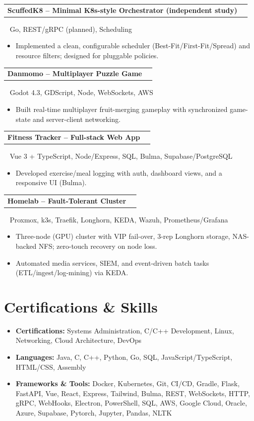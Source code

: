 \documentclass[letterpaper,11pt]{article}
\makeatletter
\newcommand{\resumeItem}[1]{\item\small{#1}}
\newcommand{\resumeProjectHeading}[4]{
  \vspace{-2pt}\item
  \begin{tabular*}{0.97\textwidth}{l@{\extracolsep{\fill}}r}
    \textbf{#1} \href{#4}{\faLink} & {\Large #2} \\
  \end{tabular*}\vspace{-2pt}
  {\small\faDatabase\ \hspace{-0.15in} {\tiny #3}}\\[-10pt]
}
\newcommand{\resumeSubHeadingListStart}{\begin{itemize}[label={},parsep=0pt]}
\newcommand{\resumeSubHeadingListEnd}{\end{itemize}}
\makeatother
\begin{document}
  \resumeProjectHeading{ScuffedK8 -- Minimal K8s-style Orchestrator (independent study)}{\faGithub}{Go, REST/gRPC (planned), Scheduling}{https://github.com/ndg8743/ScuffedK8}
    \begin{itemize}
      \resumeItem{Implemented a clean, configurable scheduler (Best-Fit/First-Fit/Spread) and resource filters; designed for pluggable policies.}
    \end{itemize}

  \resumeProjectHeading{Danmomo -- Multiplayer Puzzle Game}{\faGithub}{Godot 4.3, GDScript, Node, WebSockets, AWS}{https://github.com/ndg8743/Danmomo}
    \begin{itemize}
      \resumeItem{Built real-time multiplayer fruit-merging gameplay with synchronized game-state and server-client networking.}
    \end{itemize}

  \resumeProjectHeading{Fitness Tracker -- Full-stack Web App}{\faGithub}{Vue 3 + TypeScript, Node/Express, SQL, Bulma, Supabase/PostgreSQL}{https://github.com/ndg8743/WSP-Final-Project-Fall2024}
    \begin{itemize}
      \resumeItem{Developed exercise/meal logging with auth, dashboard views, and a responsive UI (Bulma).}
    \end{itemize}

  \resumeProjectHeading{Homelab -- Fault-Tolerant Cluster}{\faServer}{Proxmox, k3s, Traefik, Longhorn, KEDA, Wazuh, Prometheus/Grafana}{https://github.com/ndg8743}
    \begin{itemize}
      \resumeItem{Three-node (GPU) cluster with VIP fail-over, 3-rep Longhorn storage, NAS-backed NFS; zero-touch recovery on node loss.}
      \resumeItem{Automated media services, SIEM, and event-driven batch tasks (ETL/ingest/log-mining) via KEDA.}
    \end{itemize}

\vspace{-8pt}
\section{Certifications \& Skills}
\resumeSubHeadingListStart
  \resumeItem{\textbf{Certifications:} Systems Administration, C/C++ Development, Linux, Networking, Cloud Architecture, DevOps}
  \resumeItem{\textbf{Languages:} Java, C, C++, Python, Go, SQL, JavaScript/TypeScript, HTML/CSS, Assembly}
  \resumeItem{\textbf{Frameworks \& Tools:} Docker, Kubernetes, Git, CI/CD, Gradle, Flask, FastAPI, Vue, React, Express, Tailwind, Bulma, REST, WebSockets, HTTP, gRPC, WebHooks, Electron, PowerShell, SQL, AWS, Google Cloud, Oracle, Azure, Supabase, Pytorch, Jupyter, Pandas, NLTK}
\resumeSubHeadingListEnd

\end{document}
